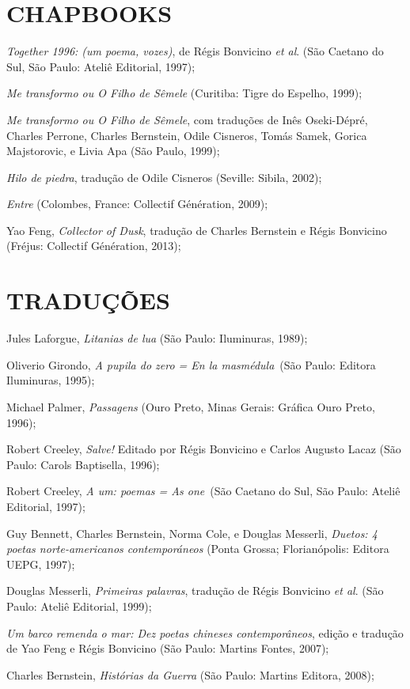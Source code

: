 \section{CHAPBOOKS}

\begin{Parskip}
\emph{Together 1996: (um poema, vozes)}, de Régis Bonvicino \emph{et
al}. (São Caetano do Sul, São Paulo: Ateliê Editorial, 1997);

\emph{Me transformo ou O Filho de Sêmele} (Curitiba: Tigre do Espelho, 1999);

\emph{Me transformo ou O Filho de Sêmele}, com traduções de Inês
Oseki-Dépré, Charles Perrone, Charles Bernstein, Odile Cisneros, Tomás
Samek, Gorica Majstorovic, e Livia Apa (São Paulo, 1999);

\emph{Hilo de piedra}, tradução de Odile Cisneros (Seville: Sibila, 2002);

\emph{Entre} (Colombes, France: Collectif Génération, 2009);

Yao Feng, \emph{Collector of Dusk}, tradução de Charles Bernstein e
Régis Bonvicino (Fréjus: Collectif Génération, 2013);
\end{Parskip}

\section{TRADUÇÕES}

\begin{Parskip}
Jules Laforgue, \emph{Litanias de lua} (São Paulo: Iluminuras, 1989);

Oliverio Girondo, \emph{A pupila do zero = En la masmédula}~(São Paulo:
Editora Iluminuras, 1995);

Michael Palmer, \emph{Passagens} (Ouro Preto, Minas Gerais: Gráfica Ouro
Preto, 1996);

Robert Creeley, \emph{Salve!} Editado por Régis Bonvicino e Carlos
Augusto Lacaz (São Paulo: Carols Baptisella, 1996);

Robert Creeley, \emph{A um: poemas = As one}~(São Caetano do Sul, São
Paulo: Ateliê Editorial, 1997);

Guy Bennett, Charles Bernstein, Norma Cole, e Douglas Messerli,
\emph{Duetos: 4 poetas norte-americanos contemporáneos} (Ponta Grossa;
Florianópolis: Editora UEPG, 1997);

Douglas Messerli, \emph{Primeiras palavras}, tradução de Régis Bonvicino
\emph{et al}. (São Paulo: Ateliê Editorial, 1999);

\emph{Um barco remenda o mar: Dez poetas chineses contemporâneos},
edição e tradução de Yao Feng e Régis Bonvicino (São Paulo: Martins
Fontes, 2007);

Charles Bernstein, \emph{Histórias da Guerra} (São Paulo: Martins
Editora, 2008);
\end{Parskip}


